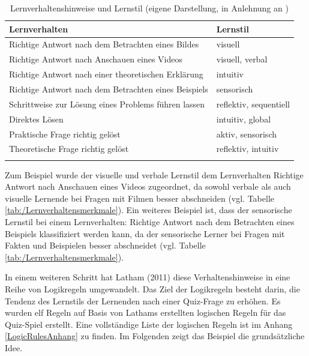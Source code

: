 \begingroup
  \footnotesize    
\useunder{\uline}{\ul}{}
\begin{longtable}{|m{7.5cm}|m{7.5cm}|}
  \hline     
  \rowcolor[HTML]{EFEFEF}                                         
  \centering \textbf{Lernverhalten} & \centering \arraybackslash \textbf{ Lernstil} \\ 
  \hline  \hline 
  Richtige Antwort nach dem Betrachten eines Bildes  & visuell                                                       \\ \hline
  Richtige Antwort nach Anschauen eines Videos         & visuell, verbal \\ \hline
  Richtige Antwort nach einer theoretischen Erklärung & intuitiv                                                     \\ \hline
  Richtige Antwort nach dem Betrachten eines Beispiels & sensorisch                                                    \\ \hline
  Schrittweise zur Lösung eines Problems führen lassen & reflektiv, sequentiell \\ \hline
  Direktes Lösen                                                                                 & intuitiv, global   \\ \hline
  Praktische Frage richtig gelöst                                                              & aktiv, sensorisch  \\ \hline
  Theoretische Frage richtig gelöst                                                                & reflektiv, intuitiv \\ \hline
\caption[Lernverhaltenshinweise und Lernstil]{Lernverhaltenshinweise und Lernstil (eigene Darstellung, in Anlehnung an \parencite[58]{Latham.2011})} 
\label{tab:/Lernverhaltenshinweise} 
\end{longtable}
\endgroup     

Zum Beispiel wurde der visuelle und verbale Lernstil dem Lernverhalten \glqq Richtige Antwort nach Anschauen eines Videos\grqq{} 
zugeordnet, da 
sowohl verbale als auch visuelle Lernende bei Fragen mit Filmen besser abschneiden (vgl. Tabelle \ref{tab:/Lernverhaltensmerkmale}).
Ein weiteres Beispiel ist, dass der sensorische Lernstil bei einem Lernverhalten: \glqq Richtige Antwort 
nach dem Betrachten eines Beispiels \grqq{} klassifiziert werden kann, da der sensorische Lerner bei Fragen 
mit Fakten und Beispielen besser abschneidet  (vgl. Tabelle \ref{tab:/Lernverhaltensmerkmale}).

In einem weiteren Schritt hat Latham (2011) diese Verhaltenshinweise in eine Reihe von Logikregeln umgewandelt.
Das Ziel der Logikregeln besteht darin, die Tendenz des Lernstils der Lernenden nach einer Quiz-Frage zu erhöhen. \parencite[70]{Latham.2011}
Es wurden elf Regeln auf Basis von Lathams erstellten logischen Regeln für das Quiz-Spiel erstellt. \parencite[215 f.]{Latham.2011}
Eine vollständige Liste der logischen Regeln ist im Anhang \ref{LogicRulesAnhang} zu finden.
Im Folgenden zeigt das Beispiel die grundsätzliche Idee. 

